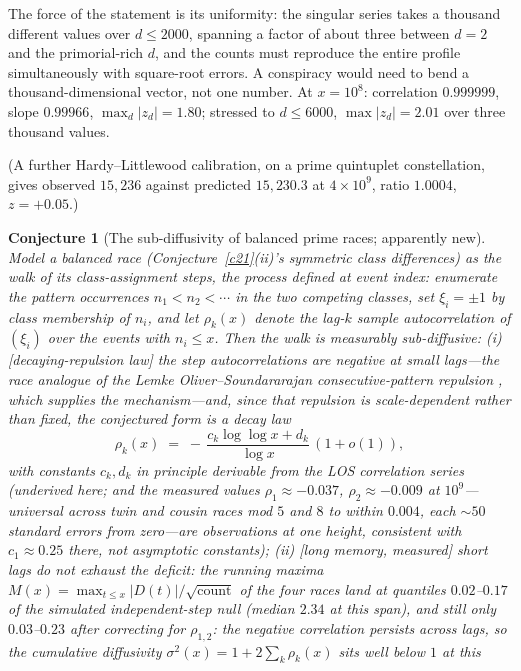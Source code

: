 \documentclass[11pt]{article}
\newtheorem{conjecture}{Conjecture}
\theoremstyle{definition}
\begin{document}
The force of the statement is its uniformity: the singular series takes
a thousand different values over $d\le2000$, spanning a factor of about
three between $d=2$ and the primorial-rich $d$, and the counts must
reproduce the entire profile simultaneously with square-root errors.  A
conspiracy would need to bend a thousand-dimensional vector, not one
number.  At $x=10^8$: correlation $0.999999$, slope $0.99966$,
$\max_d|z_d|=1.80$; stressed to $d\le6000$, $\max|z_d|=2.01$ over three
thousand values.

(A further Hardy--Littlewood calibration, on a prime quintuplet
constellation, gives observed $15{,}236$ against predicted
$15{,}230.3$ at $4\times10^9$, ratio $1.0004$, $z=+0.05$.)

\setcounter{conjecture}{8}%
\begin{conjecture}[The sub-diffusivity of balanced prime races;
apparently new]\label{c18}
Model a balanced race (Conjecture~\ref{c21}(ii)'s symmetric class
differences) as the walk of its class-assignment steps, the process
defined at event index: enumerate
the pattern occurrences $n_1<n_2<\cdots$ in the two competing
classes, set $\xi_i=\pm1$ by class membership of $n_i$, and let
$\rho_k(x)$ denote the lag-$k$ sample autocorrelation of
$(\xi_i)$ over the events with $n_i\le x$.  Then the
walk is measurably \emph{sub-diffusive}:
\emph{(i)} [decaying-repulsion law] the step autocorrelations are
negative at small lags---the race analogue of the Lemke
Oliver--Soundararajan consecutive-pattern repulsion \cite{LOS},
which supplies the mechanism---and, since that repulsion is
scale-dependent rather than fixed, the conjectured form is a decay
law
\[
\rho_k(x)\;=\;-\,\frac{c_k\log\log x+d_k}{\log x}\,(1+o(1)),
\]
with constants $c_k,d_k$ in principle derivable from the LOS
correlation series (underived here; and the measured values
$\rho_1\approx-0.037$, $\rho_2\approx-0.009$ at $10^9$---universal
across twin and cousin races mod $5$ and $8$ to within $0.004$, each
${\sim}50$ standard errors from zero---are observations at one height,
consistent with $c_1\approx0.25$ there, not asymptotic constants);
\emph{(ii)} [long memory, measured] short lags do not exhaust the
deficit: the running maxima
$M(x)=\max_{t\le x}|D(t)|/\sqrt{\text{count}}$ of the four races
land at quantiles $0.02$--$0.17$ of the simulated independent-step
null (median $2.34$ at this span), and still only $0.03$--$0.23$
after correcting for $\rho_{1,2}$: the negative correlation persists
across lags, so the cumulative diffusivity
$\sigma^2(x)=1+2\sum_k\rho_k(x)$ sits well below $1$ at this

\end{conjecture}
\end{document}
